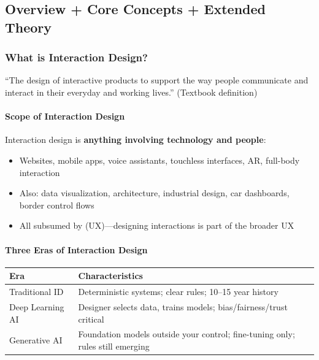 \subsection{Overview + Core Concepts + Extended Theory}

\subsubsection*{What is Interaction Design?}

\begin{defbox}
``The design of interactive products to support the way people communicate and interact in their everyday and working lives.'' (Textbook definition)
\end{defbox}

\paragraph*{Scope of Interaction Design}
Interaction design is \textbf{anything involving technology and people}:
\begin{itemize}
  \item Websites, mobile apps, voice assistants, touchless interfaces, AR, full-body interaction
  \item Also: data visualization, architecture, industrial design, car dashboards, border control flows
  \item All subsumed by  (UX)---designing interactions is part of the broader UX
\end{itemize}

\paragraph*{Three Eras of Interaction Design}
\begin{center}
\renewcommand{\arraystretch}{1.2}
\begin{tabular}{@{} l p{9cm} @{}}
\toprule
\textbf{Era} & \textbf{Characteristics} \\
\midrule
Traditional ID & Deterministic systems; clear rules; 10--15 year history \\
Deep Learning AI & Designer selects data, trains models; bias/fairness/trust critical \\
Generative AI & Foundation models outside your control; fine-tuning only; rules still emerging \\
\bottomrule
\end{tabular}
\end{center}

